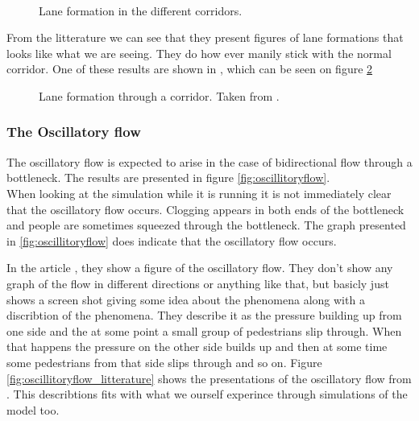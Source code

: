 \begin{figure}[h]
\centering
{}
\\
\caption{Lane formation in the different corridors.}
\label{fig:laneformation}
\end{figure}

From the litterature we can see that they present figures of lane formations
 that looks like what we are seeing. They do how ever manily stick with the normal corridor. One of these results are shown in \cite{lanes}, which can be seen on figure \ref{fig:laneformation_litterature}
\begin{figure}[h]
\centering
{}
\caption{Lane formation through a corridor. Taken from \cite{lanes}.}
\label{fig:laneformation_litterature}
\end{figure}
 


\subsubsection{The Oscillatory flow}
The oscillatory flow is expected to arise in the case of bidirectional
flow through a bottleneck. The results are presented in figure
\ref{fig:oscillitoryflow}.\\

When looking at the simulation while it is running it is not
immediately clear that the oscillatory flow occurs. Clogging
appears in both ends of the bottleneck and people are sometimes
squeezed through the bottleneck. The graph presented in
\ref{fig:oscillitoryflow} does indicate that the oscillatory
flow occurs.

In the article \cite{oscil}, they show a figure of the oscillatory flow. They 
don't show any graph of the flow in different directions or anything like 
that, but basicly just shows a screen shot giving some idea about the 
phenomena along with a discribtion of the phenomena. They describe it as the 
pressure building up from one side and the at some point a small group of 
pedestrians slip through. When that happens the pressure on the other side 
builds up and then at some time some pedestrians from that side slips through 
and so on. Figure \ref{fig:oscillitoryflow_litterature} shows the 
presentations of the oscillatory flow from \cite{oscil}. This describtions 
fits with what we ourself experince through simulations of the model too.

